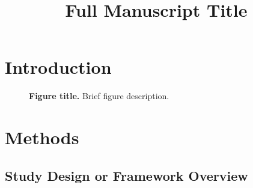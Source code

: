 \documentclass[Afour,sagev,times]{sagej}
\begin{document}
\title{Full Manuscript Title}





\begin{abstract}
\end{abstract}


\maketitle

\section{Introduction}


\begin{figure}[ht]
    \centering
    \caption{
    \textbf{Figure title.}
    Brief figure description.
    }
    \label{fig:figure1}
\end{figure}

\section{Methods}


\subsection{Study Design or Framework Overview}

\end{document}
